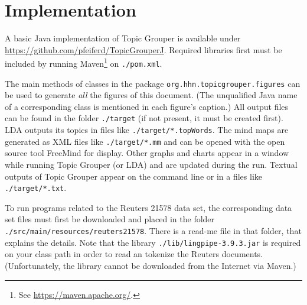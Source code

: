 \documentclass[10pt, a4paper, oneside]{article}
\begin{document}
\section{Implementation}

A basic Java implementation of Topic Grouper is available under\\
\href{https://github.com/pfeiferd/TopicGrouperJ}{https://github.com/pfeiferd/TopicGrouperJ}.
Required libraries first must be included by running Maven\footnote{See \href{https://maven.apache.org/}{https://maven.apache.org/}.} on \texttt{./pom.xml}.

The main methods of classes in the package \texttt{org.hhn.topicgrouper.figures} can be used to generate \emph{all} the figures of this document.
(The unqualified Java name of a corresponding class is mentioned in each figure's caption.)
All output files can be found in the folder \texttt{./target} (if not present, it must be created first).
LDA outputs its topics in files like \texttt{./target/*.topWords}.
The mind maps are generated as XML files like \texttt{./target/*.mm} and can be opened with the open source tool FreeMind for display.
Other graphs and charts appear in a window while running Topic Grouper (or LDA) and are updated during the run.
Textual outputs of Topic Grouper appear on the command line or in a files like \texttt{./target/*.txt}.

To run programs related to the Reuters 21578 data set, the corresponding data set files must first be downloaded and placed in the folder
\texttt{./src/main/resources/reuters21578}. There is a read-me file in that folder, that explains the details.
Note that the library \texttt{./lib/lingpipe-3.9.3.jar} is required on your class path in order to read an tokenize the Reuters documents. (Unfortunately, the library cannot be downloaded from the Internet via Maven.)


\nocite{*} %
\end{document}
